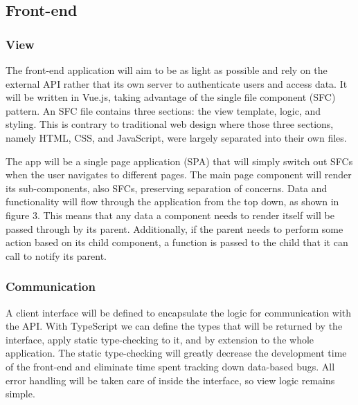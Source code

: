\documentclass[draftclsnofoot,onecolumn,journal,letterpaper,compsoc,10pt]{IEEEtran}
\begin{document}
    \subsection{Front-end}
    \subsubsection{View}
    The front-end application will aim to be as light as possible and rely on the external API rather that its own server to authenticate users and access data. It will be written in Vue.js, taking advantage of the single file component (SFC) pattern. An SFC file contains three sections: the view template, logic, and styling. This is contrary to traditional web design where those three sections, namely HTML, CSS, and JavaScript, were largely separated into their own files. 

    The app will be a single page application (SPA) that will simply switch out SFCs when the user navigates to different pages. The main page component will render its sub-components, also SFCs, preserving separation of concerns. Data and functionality will flow through the application from the top down, as shown in figure 3. This means that any data a component needs to render itself will be passed through by its parent. Additionally, if the parent needs to perform some action based on its child component, a function is passed to the child that it can call to notify its parent.
    
    \subsubsection{Communication}
    A client interface will be defined to encapsulate the logic for communication with the API. With TypeScript we can define the types that will be returned by the interface, apply static type-checking to it, and by extension to the whole application. The static type-checking will greatly decrease the development time of the front-end and eliminate time spent tracking down data-based bugs. All error handling will be taken care of inside the interface, so view logic remains simple.
    
\end{document}
